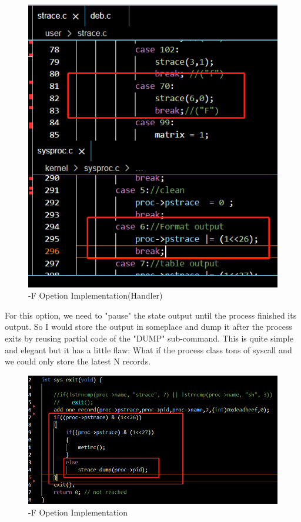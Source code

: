 \documentclass[11pt,oneside,a4paper]{article}
\begin{document}
\begin{figure}[H]
    \includegraphics[width=4.75in]{1-27.png}
    \centering
    \caption{-F Opetion Implementation(Handler)}
\end{figure}

For this option, we need to "pause" the state output until the process finished its output.
So I would store the output in someplace and dump it after the process exits by reusing partial 
code of the "DUMP" sub-command. This is quite simple and elegant but it has a little flaw: What if
the process class tons of syscall and we could only store the latest N records. 

\begin{figure}[H]
    \includegraphics[width=4.75in]{1-24.png}
    \centering
    \caption{-F Opetion Implementation}
\end{figure}
\end{document}
